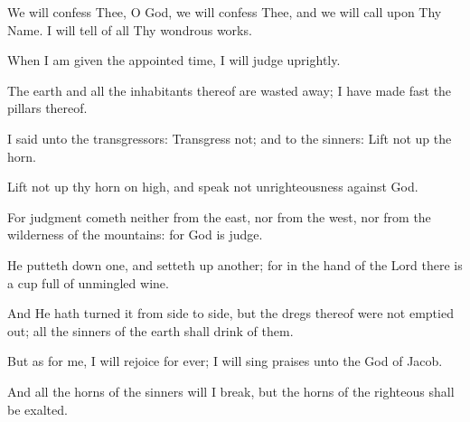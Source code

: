 We will confess Thee, O God, we will confess Thee, and we will call upon Thy Name. I will tell of all Thy wondrous works.

When I am given the appointed time, I will judge uprightly.

The earth and all the inhabitants thereof are wasted away; I have made fast the pillars thereof.

I said unto the transgressors: Transgress not; and to the sinners: Lift not up the horn.

Lift not up thy horn on high, and speak not unrighteousness against God.

For judgment cometh neither from the east, nor from the west, nor from the wilderness of the mountains: for God is judge.

He putteth down one, and setteth up another; for in the hand of the Lord there is a cup full of unmingled wine.

And He hath turned it from side to side, but the dregs thereof were not emptied out; all the sinners of the earth shall drink of them.

But as for me, I will rejoice for ever; I will sing praises unto the God of Jacob.

And all the horns of the sinners will I break, but the horns of the righteous shall be exalted.
